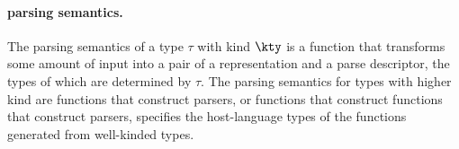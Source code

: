 {%






\paragraph*{\ddc{} parsing semantics.}
\label{sec:parse-sem}
The parsing semantics of a type $\tau$ with kind $\kty$ is a function that
transforms some amount of input into a pair of a representation and a
parse descriptor, the types of which are determined by $\tau$.  The
parsing semantics for types with higher kind are functions that
construct parsers, or functions that construct functions that
construct parsers, \etc{}  specifies
the host-language types of the functions generated from well-kinded
\ddc{} types.

}
